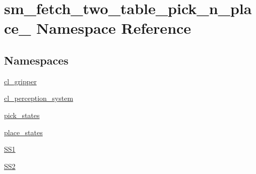 \hypertarget{namespacesm__fetch__two__table__pick__n__place__1}{}\section{sm\+\_\+fetch\+\_\+two\+\_\+table\+\_\+pick\+\_\+n\+\_\+place\+\_ Namespace Reference}
\label{namespacesm__fetch__two__table__pick__n__place__1}
\subsection*{Namespaces}
\begin{DoxyCompactItemize}
\item 
 \hyperlink{namespacesm__fetch__two__table__pick__n__place__1_1_1cl__gripper}{cl\+\_\+gripper}
\item 
 \hyperlink{namespacesm__fetch__two__table__pick__n__place__1_1_1cl__perception__system}{cl\+\_\+perception\+\_\+system}
\item 
 \hyperlink{namespacesm__fetch__two__table__pick__n__place__1_1_1pick__states}{pick\+\_\+states}
\item 
 \hyperlink{namespacesm__fetch__two__table__pick__n__place__1_1_1place__states}{place\+\_\+states}
\item 
 \hyperlink{namespacesm__fetch__two__table__pick__n__place__1_1_1SS1}{S\+S1}
\item 
 \hyperlink{namespacesm__fetch__two__table__pick__n__place__1_1_1SS2}{S\+S2}
\end{DoxyCompactItemize}
